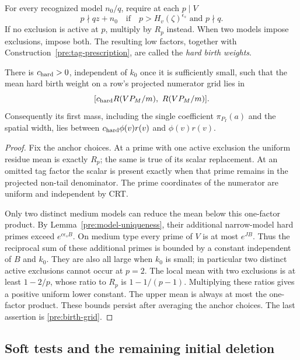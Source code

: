 For every recognized model $n_0/q$, require at each $p\mid V$
\begin{equation}
 p\nmid qz+n_0
 \quad\text{if}\quad p>H_v(\zeta)^{\epsilon_s}
 \text{ and }p\nmid q.
 \label{pre:low-hard-tests}
\end{equation}
If no exclusion is active at $p$, multiply by $R_p$ instead. When
two models impose exclusions, impose both. The resulting low
factors, together with Construction~\ref{pre:tag-prescription},
are called the \emph{hard birth weights}.

\begin{lemma}
\label{pre:hard-mean}
There is $c_{\rm hard}>0$, independent of $k_0$ once it is
sufficiently small, such that the mean hard birth weight on a row's
projected numerator grid lies in
\[
 [c_{\rm hard}R(VP_M/m),\ R(VP_M/m)].
\]
Consequently its first mass, including the single coefficient
$\pi_{P_I}(a)$ and the spatial width, lies between
$c_{\rm hard}\phi(v)r(v)$ and $\phi(v)r(v)$.
\end{lemma}

\begin{proof}
Fix the anchor choices. At a prime with one active exclusion the
uniform residue mean is exactly $R_p$; the same is true of its
scalar replacement. At an omitted tag factor the scalar is
present exactly when that prime remains in the projected
non-tail denominator. The prime coordinates of the numerator
are uniform and independent by CRT.

Only two distinct medium models can reduce the mean below this
one-factor product. By Lemma~\ref{pre:model-uniqueness}, their
additional narrow-model hard primes exceed $e^{c\epsilon_sB}$.
On medium type every prime of $V$ is at most $e^{JB}$. Thus the
reciprocal sum of these additional primes is bounded by a
constant independent of $B$ and $k_0$. They are also all large
when $k_0$ is small; in particular two distinct active exclusions
cannot occur at $p=2$. The local mean with two exclusions is at
least $1-2/p$, whose ratio to $R_p$ is $1-1/(p-1)$.
Multiplying these ratios gives a positive uniform lower constant.
The upper mean is always at most the one-factor product.
These bounds persist after averaging the anchor choices.
The last assertion is \eqref{pre:birth-grid}.
\end{proof}

\subsection{Soft tests and the remaining initial deletion}

